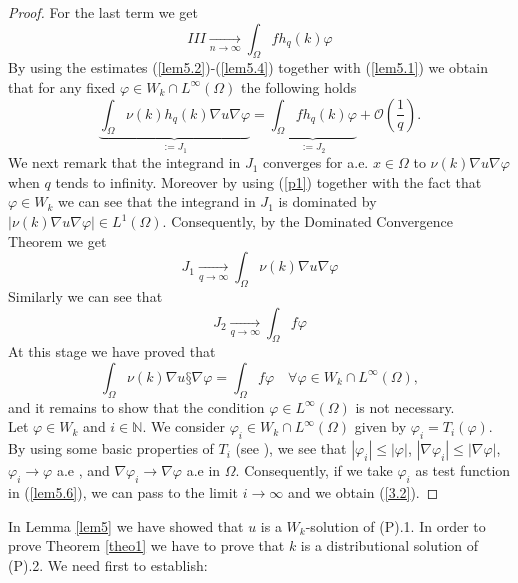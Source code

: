 \documentclass{elsart}
\begin{document}
\begin{proof}
For the last term we get 
\begin{equation}
III \underset{n\to\infty}{\rightarrow} \int_{\Omega}f h_q(k)\varphi \label{lem5.4}
\end{equation}
By using the estimates (\ref{lem5.2})-(\ref{lem5.4}) together with (\ref{lem5.1})
we obtain that for any fixed $\varphi \in W_k \cap L^{\infty}(\Omega)$
the following holds 
\begin{equation}
\underbrace{\int_{\Omega}\nu(k)h_q(k)\nabla u\nabla \varphi
}_{:=J_1} = 
\underbrace{\int_{\Omega} f h_q(k)\varphi
}_{:=J_2} + \mathcal{O}(\frac{1}{q}). \label{lem5.5}
\end{equation}
We next remark that the integrand in $J_1$ converges for a.e. $x \in
\Omega$ to $\nu(k)\nabla u \nabla \varphi$ when $q$ tends to
infinity. Moreover by using (\ref{p1}) together with the fact that
$\varphi\in W_k$ we can see that the integrand in $J_1$ is dominated
by $|\nu(k)\nabla u \nabla \varphi| \in L^1(\Omega)$. Consequently, by
the Dominated Convergence Theorem we get 
$$J_1 \underset{q\to\infty}{\rightarrow}\int_{\Omega} \nu(k)\nabla u
\nabla \varphi$$
Similarly we can see that 
$$J_2 \underset{q\to\infty}{\rightarrow} \int_{\Omega} f \varphi$$
At this stage we have proved that 
\begin{equation}
\int_{\Omega} \nu(k)\nabla u§\nabla \varphi =  \int_{\Omega} f \varphi
\quad \forall \varphi \in W_k\cap L^{\infty}(\Omega), \label{lem5.6}
\end{equation}
and it remains to show that the condition $\varphi\in
L^{\infty}(\Omega)$ is not necessary. \\ 
Let $\varphi \in W_k$ and $i\in \mathbb N$. We consider 
$\varphi_i \in  W_k\cap L^{\infty}(\Omega)$ given by 
$\varphi_i = T_i(\varphi)$. By using some basic properties of $T_i$
(see \cite{gal}), we see that $|\varphi_i| \leq |\varphi|$, $|\nabla \varphi_i|
\leq |\nabla \varphi|$, $\varphi_i \to \varphi$ a.e
, and $\nabla \varphi_i \to \nabla \varphi$ a.e in
$\Omega$. Consequently, if we take $\varphi_i$ as test function in
(\ref{lem5.6}), we can pass to the limit $i\to\infty$ and we obtain   
(\ref{3.2}).
\end{proof}

In Lemma \ref{lem5} we have showed that $u$ is a $W_k$-solution of
(P).1. In order to prove Theorem \ref{theo1} we have to prove that $k$
is a distributional solution of (P).2. We need first to establish: 
\end{document}
